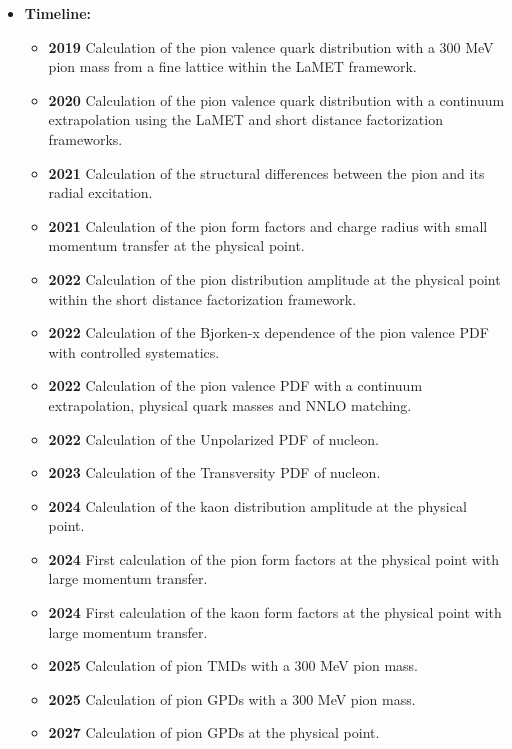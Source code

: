 \documentclass[12pt,hyperpdf]{article}
\begin{document}
\begin{itemize}
\item{\bf Timeline:}
\begin{itemize}
    \item{\bf 2019} Calculation of the pion valence quark distribution with a 300 MeV pion mass from a fine lattice within the LaMET framework.~\cite{Izubuchi:2019lyk}
    \item{\bf 2020} Calculation of the pion valence quark distribution with a continuum extrapolation using the LaMET and short distance factorization frameworks.~\cite{Gao:2020ito}
    \item{\bf 2021} Calculation of the structural differences between the pion and its radial excitation.~\cite{Gao:2021hvs}
    \item{\bf 2021} Calculation of the pion form factors and charge radius with small momentum transfer at the physical point.~\cite{Gao:2021xsm}
    \item{\bf 2022} Calculation of the pion distribution amplitude at the physical point within the short distance factorization framework.~\cite{Gao:2022vyh}
    \item{\bf 2022} Calculation of the Bjorken-x dependence of the pion valence PDF with controlled systematics.~\cite{Gao:2021dbh}
    \item{\bf 2022} Calculation of the pion valence PDF with a continuum extrapolation, physical quark masses and NNLO matching.~\cite{Gao:2022iex}
    \item{\bf 2022} Calculation of the Unpolarized PDF of nucleon.~\cite{Gao:2022uhg}
    \item{\bf 2023} Calculation of the Transversity PDF of nucleon.~\cite{Gao:2023ktu}
    \item{\bf 2024} Calculation of the kaon distribution amplitude at the physical point.
    \item{\bf 2024} First calculation of the pion form factors at the physical point with large momentum transfer.
    \item{\bf 2024} First calculation of the kaon form factors at the physical point with large momentum transfer.
    \item{\bf 2025} Calculation of pion TMDs with a 300 MeV pion mass.
    \item{\bf 2025} Calculation of pion GPDs with a 300 MeV pion mass.
    \item{\bf 2027} Calculation of pion GPDs at the physical point.
\end{itemize}
\end{itemize}
\end{document}
